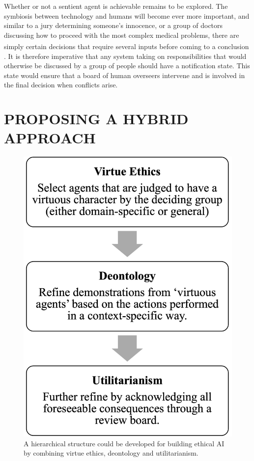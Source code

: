 \documentclass[10pt]{article}
\begin{document}
Whether or not a sentient agent is achievable remains to be explored. The symbiosis between technology and humans will become ever more important, and similar to a jury determining someone’s innocence, or a group of doctors discussing how to proceed with the most complex medical problems, there are simply certain decisions that require several inputs before coming to a conclusion \textsuperscript{\cite{hindocha_moral_2022}}. It is therefore imperative that any system taking on responsibilities that would otherwise be discussed by a group of people should have a notification state. This state would ensure that a board of human overseers intervene and is involved in the final decision when conflicts arise. 

\section{PROPOSING A HYBRID APPROACH}

\begin{figure}
    \centering
    \includegraphics[scale=0.7]{three_planes.png}
    \caption{A hierarchical structure could be developed for building ethical AI by combining virtue ethics, deontology and utilitarianism.}
    \label{fig:my_label}
\end{figure}
\end{document}
